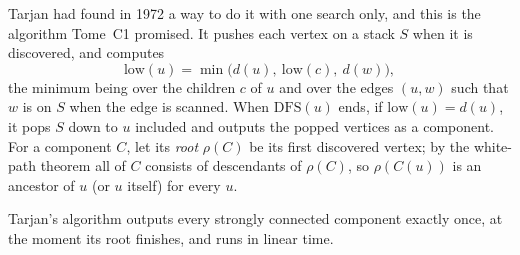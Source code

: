 Tarjan had found in 1972 a way to do it with one search only, and this is the algorithm Tome~C1 promised. It pushes each vertex on a stack $S$ when it is discovered, and computes
\[
\mathrm{low}(u)=\min\big(d(u),\ \mathrm{low}(c),\ d(w)\big),
\]
the minimum being over the children $c$ of $u$ and over the edges $(u,w)$ such that $w$ is on $S$ when the edge is scanned.
When $\mathrm{DFS}(u)$ ends, if $\mathrm{low}(u)=d(u)$, it pops $S$ down to $u$ included and outputs the popped vertices as a component. For a component $C$, let its \emph{root} $\rho(C)$ be its first discovered vertex;
by the white-path theorem all of $C$ consists of descendants of $\rho(C)$, so $\rho(C(u))$ is an ancestor of $u$ (or $u$ itself) for every $u$.

\begin{theorem}[Tarjan, 1972]\label{thm:tarjan}
Tarjan's algorithm outputs every strongly connected component exactly once, at the moment its root finishes, and runs in linear time.
\end{theorem}
